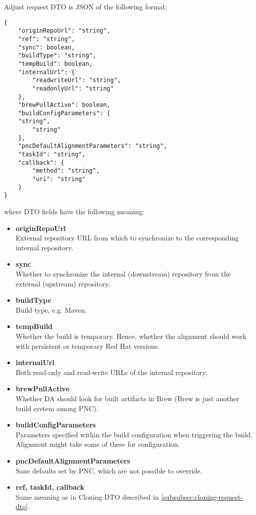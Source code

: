 \documentclass[../main.tex]{subfiles}
\begin{document}
Adjust request DTO is JSON of the following format:

\begin{lstlisting}[numbers=none]
{
    "originRepoUrl": "string",
    "ref": "string",
    "sync": boolean,
    "buildType": "string",
    "tempBuild": boolean,
    "internalUrl": {
        "readwriteUrl": "string",
        "readonlyUrl": "string"
    },
    "brewPullActive": boolean,
    "buildConfigParameters": {
	"string",
        "string"
    },
    "pncDefaultAlignmentParameters": "string",
    "taskId": "string",
    "callback": {
        "method": "string",
        "uri": "string"
    }
}
\end{lstlisting}

where DTO fields have the following meaning:
\begin{itemize}
    \item \textbf{originRepoUrl}\\
    External repository URL from which to synchronize to the corresponding internal repository.

    \item \textbf{sync}\\
    Whether to synchronize the internal (downstream) repository from the external (upstream) repository.

    \item \textbf{buildType}\\
    Build type, e.g. Maven.

    \item \textbf{tempBuild}\\
    Whether the build is temporary. Hence, whether the alignment should work with persistent or temporary Red Hat versions.

    \item \textbf{internalUrl}\\
    Both read-only and read-write URLs of the internal repository.

    \item \textbf{brewPullActive}\\
    Whether DA should look for built artifacts in Brew (Brew is just another build system among PNC).

    \item \textbf{buildConfigParameters}\\
    Parameters specified within the build configuration when triggering the build. Alignment might take some of these for configuration.

    \item \textbf{pncDefaultAlignmentParameters}\\
    Sane defaults set by PNC, which are not possible to override.

    \item \textbf{ref, taskId, callback}\\
    Same meaning as in Cloning DTO described in \ref{subsubsec:cloning-request-dto}.
\end{itemize}
\end{document}
